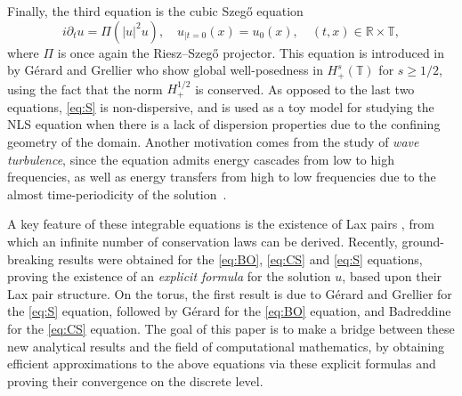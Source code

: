 \documentclass [11pt] {article}
\begin{document}
Finally, the third equation is the cubic Szeg\H o equation
\begin{equation} \label{eq:S}\tag{S}
i\partial_t u =\Pi(|u|^2u),\quad  u_{|t=0}(x)= u_{0}(x), \quad (t,x) \in \mathbb{R} \times \mathbb{T}, 
\end{equation}
\renewcommand*{\theHequation}{notag4.\theequation}
where $\Pi$ is once again the Riesz--Szeg\H o projector.
This equation is
introduced in \cite{GG10} by Gérard and Grellier who show global well-posedness in $H_{+}^s(\mathbb{T})$ for $s\geq {1}/{2}$, using the fact that the norm $H^{{1}/{2}}_{+}$ is conserved. 
As opposed to the last two equations, \eqref{eq:S} is non-dispersive, and is used as a toy model for studying the NLS equation when there is a lack of dispersion properties due to the confining geometry of the domain. Another motivation comes from the study of {\it wave turbulence}, since the equation admits energy cascades from low to high frequencies, as well as 
energy transfers from high to low frequencies due to the almost time-periodicity of the solution~\cite{GG17}.
\newline



A key feature of these integrable equations is the existence of Lax pairs \cite{GGKM67, Lax68}, from which an infinite number of conservation laws can be derived.
Recently, ground-breaking results were obtained for the \eqref{eq:BO}, \eqref{eq:CS} and \eqref{eq:S} equations,
proving the existence of an {\it explicit formula} for the solution $u$, based upon their Lax pair structure.  
On the torus, the first result is due to G\'erard and Grellier \cite{GG15} for the \eqref{eq:S} equation, followed by G\'erard \cite{G} for the \eqref{eq:BO} equation, and Badreddine \cite{Bad24} for the \eqref{eq:CS} equation.
The goal of this paper is to make a bridge between these new analytical results and the field of computational mathematics, 
by obtaining efficient approximations to the above equations via these explicit formulas and proving their convergence on the discrete level.
\end{document}
